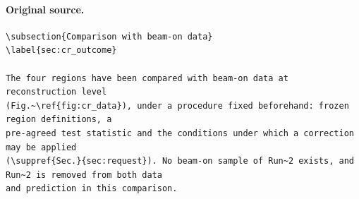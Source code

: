 \documentclass[11pt,a4paper]{article}
\newcommand{\suppref}[2]{#1~\ref{S-#2} of the technical supplement}
\begin{document}
\paragraph{Original source.}
\begin{lstlisting}[language={[LaTeX]TeX},basicstyle=\ttfamily\footnotesize,columns=fullflexible]
\subsection{Comparison with beam-on data}
\label{sec:cr_outcome}

The four regions have been compared with beam-on data at reconstruction level
(Fig.~\ref{fig:cr_data}), under a procedure fixed beforehand: frozen region definitions, a
pre-agreed test statistic and the conditions under which a correction may be applied
(\suppref{Sec.}{sec:request}). No beam-on sample of Run~2 exists, and Run~2 is removed from both data
and prediction in this comparison.


\end{lstlisting}
\end{document}
